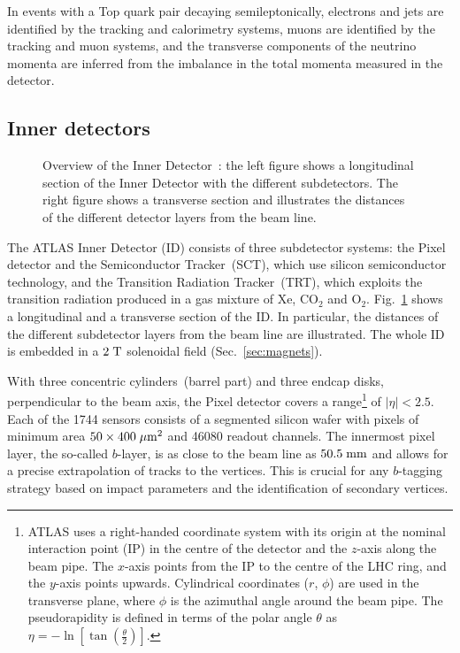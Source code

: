 In events with a Top quark pair decaying semileptonically, electrons
and jets are identified by the tracking and calorimetry systems, muons
are identified by the tracking and muon systems, and the transverse
components of the neutrino momenta are inferred from the imbalance in
the total momenta measured in the detector.

\subsection{Inner detectors}
\label{sec:ID}

\begin{figure}[h]
\centering
\caption[Overview of the Inner Detector]{
  Overview of the Inner Detector~\cite{detectorpaper}:
  the left figure shows a longitudinal section of the Inner Detector with the different subdetectors.
  The right figure shows a transverse section and illustrates the distances of the different detector layers from the beam line.}
\label{fig:ID}
\end{figure}

The ATLAS Inner Detector (ID) consists of three subdetector systems:
the Pixel detector and the Semiconductor Tracker~(SCT), which use silicon semiconductor
technology, and the Transition Radiation Tracker~(TRT), which exploits the transition radiation produced in a gas mixture of Xe, CO$_2$ and O$_2$.
Fig.~\ref{fig:ID} shows a longitudinal and a transverse section of the ID.
In particular, the distances of the different subdetector layers from the beam line are illustrated.
The whole ID is embedded in a \mbox{$2 \; \mathrm{T}$} solenoidal field (Sec.~\ref{sec:magnets}).

With three concentric cylinders~(barrel part) and three endcap disks, perpendicular to the beam axis, the Pixel detector
covers a range\footnote{ATLAS uses a right-handed coordinate system with its origin at the nominal interaction point (IP) in the centre
  of the detector and the $z$-axis along the beam pipe. The $x$-axis points from the IP to the centre of the LHC ring, and the $y$-axis points
  upwards. Cylindrical coordinates ($r$, $\phi$) are used in the transverse plane, where $\phi$ is the azimuthal angle around the beam pipe. The
  pseudorapidity is defined in terms of the polar angle $\theta$ as \mbox{$\eta = - \ln \left[ \tan \left( \frac{\theta}{2} \right) \right]$}.} of
\mbox{$|\eta| < 2.5$}.
Each of the 1744 sensors consists of a segmented silicon wafer with pixels of minimum area \mbox{$50 \times 400 \; \mu\mathrm{m}^2$} and 46080 readout channels.
The innermost pixel layer, the so-called $b$-layer, is as close to the beam line as \mbox{$50.5 \; \mathrm{mm}$} and allows for a precise extrapolation of tracks
to the vertices.
This is crucial for any $b$-tagging strategy based on impact parameters and the identification of secondary vertices.

